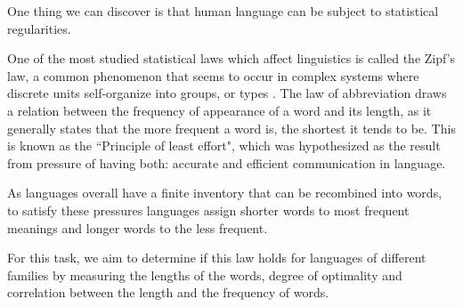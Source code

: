 One thing we can discover is that human language can be subject to statistical regularities. 

One of the most studied statistical laws which affect linguistics is called the Zipf's law, a common phenomenon that seems to occur in complex systems where discrete units self-organize into groups, or types \cite{Corral2020}. The law of abbreviation draws a relation between the frequency of appearance of a word and its length, as it generally states that the more frequent a word is, the shortest it tends to be. This is known as the ``Principle of least effort", which was hypothesized as the result from pressure of having both: accurate and efficient communication in language.

As languages overall have a finite inventory that can be recombined into words, to satisfy these pressures languages assign shorter words to most frequent meanings and longer words to the less frequent.

For this task, we aim to determine if this law holds for languages of different families by measuring the lengths of the words, degree of optimality and correlation between the length and the frequency of words.